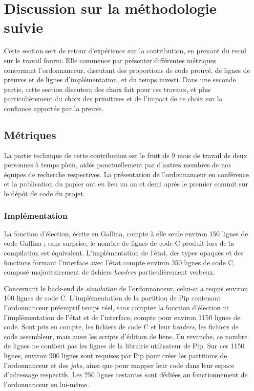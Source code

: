	\section{Discussion sur la méthodologie suivie}

		Cette section sert de retour d'expérience sur la contribution, en prenant du recul sur le travail fourni.
		Elle commence par présenter différentes métriques concernant l'ordonnanceur, discutant des proportions de code prouvé, de lignes de preuves et de lignes d'implémentation, et du temps investi. Dans une seconde partie, cette section discutera des choix fait pour ces travaux, et plus particulièrement du choix des primitives et de l'impact de ce choix sur la confiance apportée par la preuve.

		\subsection{Métriques}

		La partie technique de cette contribution est le fruit de 9 mois de travail de deux personnes à temps plein, aidés ponctuellement par d'autres membres de nos équipes de recherche respectives. La présentation de l'ordonnanceur en conférence et la publication du papier ont eu lieu un an et demi après le premier commit sur le dépôt de code du projet.

			\subsubsection{Implémentation}
			La fonction d'élection, écrite en Gallina, compte à elle seule environ 150 lignes de code Gallina ; sans surprise, le nombre de lignes de code C produit lors de la compilation est équivalent. L'implémentation de l'état, des types opaques et des fonctions formant l'interface avec l'état compte environ 350 lignes de code C, composé majoritairement de fichiers \emph{headers} particulièrement verbeux.

			Concernant le back-end de \emph{simulation} de l'ordonnanceur, celui-ci a requis environ 100 lignes de code C. L'implémentation de la partition de Pip contenant l'ordonnanceur préemptif temps réel, sans compter la fonction d'élection ni l'implémentation de l'état et de l'interface, compte pour environ 1150 lignes de code. Sont pris en compte, les fichiers de code C et leur \emph{headers}, les fichiers de code assembleur, mais aussi les scripts d'édition de liens. En revanche, ce nombre de lignes ne contient pas les lignes de la librairie utilisateur de Pip. Sur ces 1150 lignes, environ 900 lignes sont requises par Pip pour créer les partitions de l'ordonnanceur et des \emph{jobs}, ainsi que pour mapper leur code dans leur espace d'adressage respectifs. Les 250 lignes restantes sont dédiées au fonctionnement de l'ordonnanceur en lui-même.

